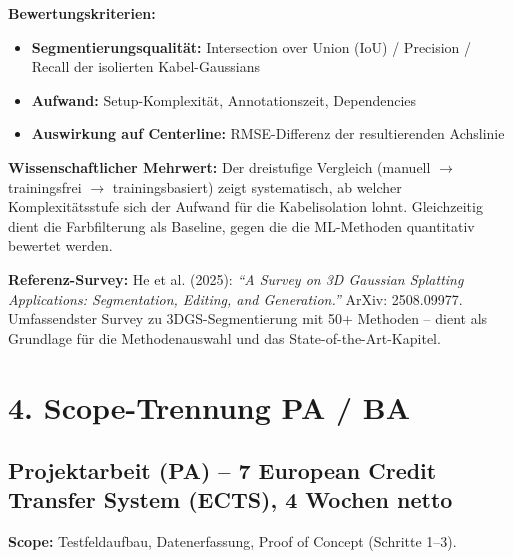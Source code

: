 \documentclass[11pt, a4paper]{article}
\begin{document}
\textbf{Bewertungskriterien:}
\begin{itemize}[noitemsep]
    \item \textbf{Segmentierungsqualit\"at:} Intersection over Union (IoU) / Precision / Recall der isolierten Kabel-Gaussians
    \item \textbf{Aufwand:} Setup-Komplexit\"at, Annotationszeit, Dependencies
    \item \textbf{Auswirkung auf Centerline:} RMSE-Differenz der resultierenden Achslinie
\end{itemize}

\begin{tcolorbox}[colback=notebg, colframe=noteblue]
\textbf{Wissenschaftlicher Mehrwert:} Der dreistufige Vergleich (manuell $\rightarrow$ trainingsfrei $\rightarrow$ trainingsbasiert) zeigt systematisch, ab welcher Komplexit\"atsstufe sich der Aufwand f\"ur die Kabelisolation lohnt. Gleichzeitig dient die Farbfilterung als Baseline, gegen die die ML-Methoden quantitativ bewertet werden.
\end{tcolorbox}

\textbf{Referenz-Survey:} He et al. (2025): \textit{``A Survey on 3D Gaussian Splatting Applications: Segmentation, Editing, and Generation.''} ArXiv: 2508.09977. Umfassendster Survey zu 3DGS-Segmentierung mit 50+ Methoden -- dient als Grundlage f\"ur die Methodenauswahl und das State-of-the-Art-Kapitel.

\section{4. Scope-Trennung PA / BA}

\subsection{Projektarbeit (PA) -- 7 European Credit Transfer System (ECTS), 4 Wochen netto}
\textbf{Scope:} Testfeldaufbau, Datenerfassung, Proof of Concept (Schritte 1--3).
\end{document}
